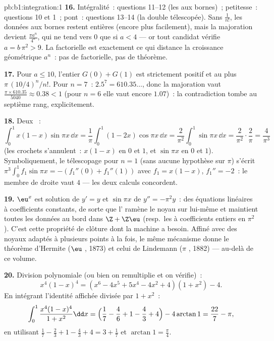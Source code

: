 \begin{solution}{pb:b1:integration:1}
\textbf{16.} Intégralité~: questions 11--12 (les  aux
bornes)~; petitesse~: questions 10 et 1~; pont~: questions
13--14 (la double  télescopée). Sans
$\frac{1}{n!}$, les données aux bornes restent entières (encore
plus facilement), mais la majoration devient $\frac{\pi a^n}{4^n}$,
qui ne tend vers $0$ que si $a < 4$ --- or tout candidat vérifie $a
= b\,\pi^2 > 9$. La factorielle est exactement ce qui distance la
croissance géométrique $a^n$~: pas de factorielle, pas de théorème.

\textbf{17.} Pour $a \leq 10$, l'entier $G(0) + G(1)$ est
strictement positif et au plus $\pi\,(10/4)^n/n!$. Pour $n = 7$~:
$2.5^7 = 610.35\dots$, donc la majoration vaut $\frac{\pi \times
610.35}{5040} \approx 0.38 < 1$ (pour $n = 6$ elle vaut encore
$1.07$)~: la contradiction tombe au septième rang, explicitement.

\textbf{18.} Deux ~:
\[
\int_0^1 x(1-x)\sin\pi x\,\dd x
= \frac1\pi\int_0^1 (1 - 2x)\cos\pi x\,\dd x
= \frac{2}{\pi^2}\int_0^1 \sin\pi x\,\dd x
= \frac{2}{\pi^2}\cdot\frac{2}{\pi} = \frac{4}{\pi^3}
\]
(les crochets s'annulent~: $x(1-x)$ en $0$ et $1$, et $\sin\pi x$
en $0$ et $1$). Symboliquement, le télescopage pour $n = 1$ (sans
aucune hypothèse sur $\pi$) s'écrit $\pi^3\int_0^1 f_1\sin\pi x =
-(f_1''(0) + f_1''(1))$ avec $f_1 = x(1 - x)$, $f_1'' = -2$~: le
membre de droite vaut $4$ --- les deux calculs concordent.

\textbf{19.} $\eu^x$ est solution de $y' = y$ et $\sin\pi x$ de
$y'' = -\pi^2 y$~: des équations linéaires à coefficients constants,
de sorte que l' ramène le noyau sur lui-même
et maintient toutes les données au bord dans $\Z + \Z\eu$ (resp.\ les
 à coefficients entiers en $\pi^2$). C'est cette propriété
de clôture dont la machine a besoin. Affiné avec des noyaux adaptés à
plusieurs points à la fois, le même mécanisme donne le théorème
d'Hermite ($\eu$ , 1873) et celui de Lindemann ($\pi$
, 1882) --- au-delà de ce volume.

\textbf{20.} Division polynomiale (ou bien on remultiplie et on
vérifie)~:
\[
x^4(1-x)^4 = (x^6 - 4x^5 + 5x^4 - 4x^2 + 4)(1 + x^2) - 4 .
\]
En intégrant l'identité affichée divisée par $1 + x^2$~:
\[
\int_0^1 \frac{x^4(1-x)^4}{1+x^2}\dd x
= \Bigl(\frac17 - \frac46 + 1 - \frac43 + 4\Bigr)
- 4\arctan 1
= \frac{22}{7} - \pi ,
\]
en utilisant $\frac17 - \frac23 + 1 - \frac43 + 4 = 3 + \frac17$ et
$\arctan 1 = \frac\pi4$.


\end{solution}
